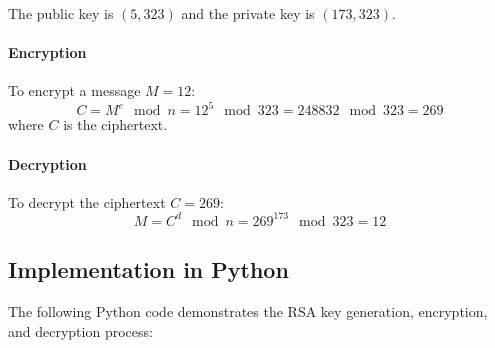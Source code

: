 \documentclass{article}
\begin{document}
The public key is \( (5, 323) \) and the private key is \( (173, 323) \).

\paragraph{Encryption}
To encrypt a message \( M = 12 \):
\[ C = M^e \mod n = 12^5 \mod 323 = 248832 \mod 323 = 269 \]
where \( C \) is the ciphertext.

\paragraph{Decryption}
To decrypt the ciphertext \( C = 269 \):
\[ M = C^d \mod n = 269^{173} \mod 323 = 12 \]

\subsection{Implementation in Python}
The following Python code demonstrates the RSA key generation, encryption, and decryption process:
\end{document}
